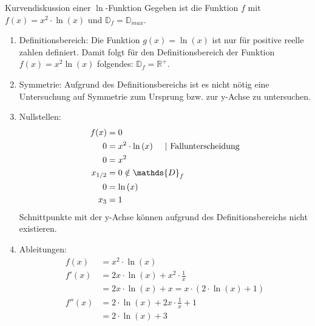  \begin{bsp}{Kurvendiskussion einer $\ln$-Funktion}{ }
Gegeben ist die Funktion $f$ mit $f(x) = x^2\cdot \ln{(x)}$ und $\mathds{D}_f = \mathds{D}_{max}$.
\begin{enumerate}
    \item Definitionsbereich: Die Funktion $g(x) = \ln{(x)}$ ist nur für positive reelle zahlen definiert. Damit folgt für den Definitionsbereich der Funktion $f(x) = x^2\ln{(x)}$ folgendes: $\mathds{D}_f = \mathds{R}^+$.
    \item Symmetrie: Aufgrund des Definitionsbereichs ist es nicht nötig eine Untersuchung auf Symmetrie zum Ursprung bzw. zur y-Achse zu untersuchen.
    \item Nullstellen: 
        \begin{equation*}
            \begin{split}
                f(x) &=0\\
                0&= x^2\cdot \ln{(x)}\hspace{0.5cm} | \text{ Fallunterscheidung}\\
                0&= x^2\\
                x_{1/2} &= 0 \notin \mathds{D}_f\\
                0&= \ln{(x)}\\
                x_3&= 1
            \end{split}
        \end{equation*}
Schnittpunkte mit der y-Achse können aufgrund des Definitionsbereichs nicht existieren.
\item Ableitungen:
        \begin{equation*}
            \begin{split}
                f(x) &=x^2\cdot \ln{(x)}\\
                f'(x)&= 2x\cdot \ln{(x)} + x^2 \cdot \frac{1}{x}\\
                &=2x\cdot \ln{(x)} + x = x\cdot (2\cdot \ln{(x)} +1)\\
                f''(x) &= 2\cdot \ln{(x)} + 2x\cdot \frac{1}{x} +1\\
                &=2\cdot \ln{(x)} + 3
            \end{split}
        \end{equation*}


\end{enumerate}
\end{bsp}

